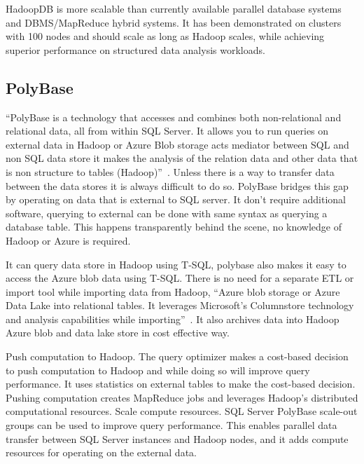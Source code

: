      HadoopDB is more scalable than currently available parallel
     database systems and DBMS/MapReduce hybrid systems. It has been
     demonstrated on clusters with 100 nodes and should scale as long
     as Hadoop scales, while achieving superior performance on
     structured data analysis workloads.
     
\subsection{PolyBase}

``PolyBase is a technology that accesses and combines both
non-relational and relational data, all from within SQL Server. It
allows you to run queries on external data in Hadoop or Azure Blob
storage acts mediator between SQL and non SQL data store it makes the
analysis of the relation data and other data that is non structure to
tables (Hadoop)''~\cite{www-polybase}. Unless there is a way to
transfer data between the data stores it is always difficult to do so.
PolyBase bridges this gap by operating on data that is external to SQL
server. It don’t require additional software, querying to external can
be done with same syntax as querying a database table.  This happens
transparently behind the scene, no knowledge of Hadoop or Azure is
required.

It can query data store in Hadoop using T-SQL, polybase also makes it
easy to access the Azure blob data using T-SQL. There is no need for a
separate ETL or import tool while importing data from Hadoop, ``Azure
blob storage or Azure Data Lake into relational tables. It leverages
Microsoft’s Columnstore technology and analysis capabilities while
importing''~\cite{www-polybase}. It also archives data into Hadoop
Azure blob and data lake store in cost effective way.

     Push computation to Hadoop. The query optimizer makes a cost-based 
     decision to push computation to Hadoop and while doing so will 
     improve query performance. It uses statistics on external tables 
     to make the cost-based decision. Pushing computation creates 
     MapReduce jobs and leverages Hadoop's distributed computational 
     resources. Scale compute resources. SQL Server PolyBase scale-out 
     groups can be used to improve query performance. This enables parallel 
     data transfer between SQL Server instances and Hadoop nodes, 
     and it adds compute resources for operating on the external data.

     \pv


